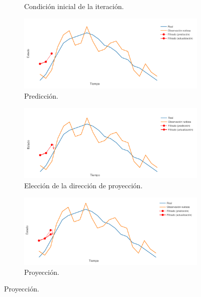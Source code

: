\begin{itemize}
\begin{figure}[h!]
\begin{subfigure}[b]{.49\linewidth}
            \caption{Condición inicial de la iteración.}
        \end{subfigure}
        \begin{subfigure}[b]{.49\linewidth}
        \centering
            \includegraphics[width=\linewidth]{img/content/chapter2/filt5.pdf}
            \caption{Predicción.}
        \end{subfigure}
        \begin{subfigure}[b]{.49\linewidth}
        \centering
            \includegraphics[width=\linewidth]{img/content/chapter2/filt6.pdf}
            \caption{Elección de la dirección de proyección.}
        \end{subfigure}
        \begin{subfigure}[b]{.49\linewidth}
        \centering
            \includegraphics[width=\linewidth]{img/content/chapter2/filt7.pdf}
            \caption{Proyección.}
        \end{subfigure}
    \end{figure}

\end{itemize}
